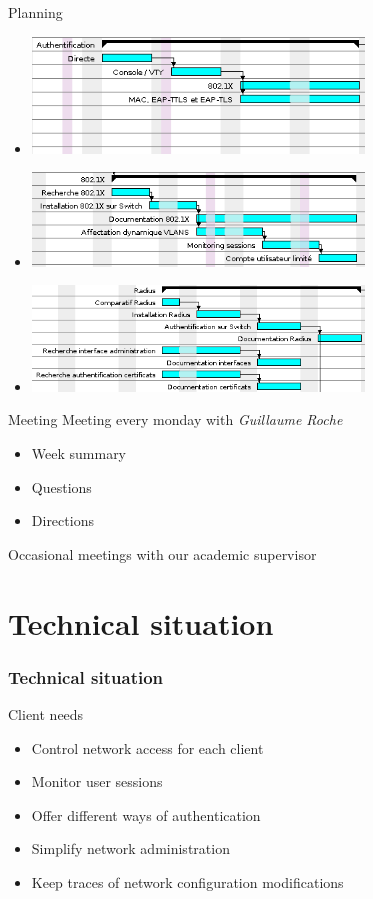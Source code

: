 \documentclass[12pt]{beamer}
\begin{document}
\begin{frame}{Planning}
    \begin{itemize}
	\item \includegraphics[width=250pt]{img/gantt_auth.png}
	\vfill
	\item \includegraphics[width=250pt]{img/gantt_dot1x.png}
	\vfill
	\item \includegraphics[width=250pt]{img/gantt_radius.png}
    \end{itemize}
\end{frame}


\begin{frame}{Meeting}
    Meeting every monday with \emph{Guillaume Roche}
    \vfill
    \begin{itemize}
	\item Week summary
	\item Questions 
	\item Directions 
    \end{itemize}
    \vfill
    Occasional meetings with our academic supervisor
\end{frame}


\part{Technical situation}
\frame{\partpage}
\section{Technical situation}

\begin{frame}{Client needs}
    \begin{itemize}
	\item Control network access for each client
	\vfill
	\item Monitor user sessions
	\vfill 
	\item Offer different ways of authentication
	\vfill
	\item Simplify network administration
	\vfill
	\item Keep traces of network configuration modifications
    \end{itemize}
\end{frame}
\end{document}
